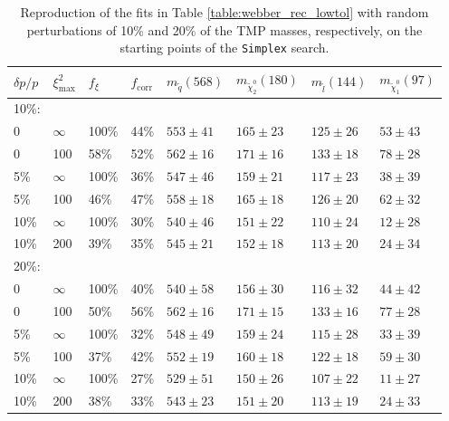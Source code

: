 \documentclass[twoside,english]{uiofysmaster}
\begin{document}
\begin{table}[hbt]
  \centering
  \begin{tabular}{| l | l | l | l  || l | l | l | l |}
    \hline
    $\delta p/p$ & $\xi^2_\mathrm{max}$ & $f_\xi$ & $f_\mathrm{corr}$ & $m_{\tilde q} (568)$ & $m_{\tilde \chi_2^0} (180)$ & $m_{\tilde l} (144)$ & $m_{\tilde \chi_1^0} (97)$ \\
    \hline \hline
    10\%: & & & & & & & \\ 
    \hline
    0 &   $\infty$ &  100\%  & 44\% & $553 \pm 41$  & $165 \pm 23$  & $125 \pm 26$  &   $53 \pm 43$ \\
    0 &   100 &   58\% & 52\% & $562 \pm 16$  & $171 \pm 16$    & $133 \pm 18$  & $78 \pm 28$ \\
    5\% &  $\infty$ &  100\%  & 36\% & $547 \pm 46$  &   $159 \pm 21$  & $117 \pm 23$& $38 \pm 39$ \\
    5\% &  100 &   46\% & 47\% & $558 \pm 18$  & $165 \pm 18$  &   $126 \pm 20$  & $62 \pm 32$ \\
    10\% & $\infty$ &  100\%  & 30\% & $540 \pm 46$  & $151 \pm 22$  & $110 \pm 24$& $12 \pm 28$ \\
    10\% & 200 &   39\% & 35\% & $545 \pm 21$  &   $152 \pm 18$  & $113 \pm 20$& $24 \pm 34$ \\
    \hline
    20\%: & & & & & & & \\ 
    \hline
    0 &   $\infty$ &  100\%  & 40\% & $540 \pm 58$  & $156 \pm 30$  & $116 \pm 32$  &   $44 \pm 42$ \\
    0 &   100 &   50\% & 56\% & $562 \pm 16$  & $171 \pm 15$  & $133 \pm 16$  & $77 \pm 28$ \\
    5\% &  $\infty$ &  100\%  & 32\% & $548 \pm 49$  &   $159 \pm 24$  & $115 \pm 28$& $33 \pm 39$ \\
    5\% &  100 &   37\% & 42\% & $552 \pm 19$  & $160 \pm 18$  &   $122 \pm 18$  & $59 \pm 30$ \\
    10\% & $\infty$ &  100\%  & 27\% & $529 \pm 51$  & $150 \pm 26$  & $107 \pm 22$& $11 \pm 27$ \\
    10\% & 200 &   38\% & 33\% & $543 \pm 23$  &   $151 \pm 20$  & $113 \pm 19$& $24 \pm 33$ \\
    \hline
  \end{tabular}
  \caption{Reproduction of the fits in Table \ref{table:webber_rec_lowtol} with random perturbations of 10\% and 20\% of the TMP masses, respectively, on the starting points of the {\tt Simplex} search.}
  \label{table:webber_rec_lowtol_perturbedSP-percentage}
\end{table}
\end{document}
